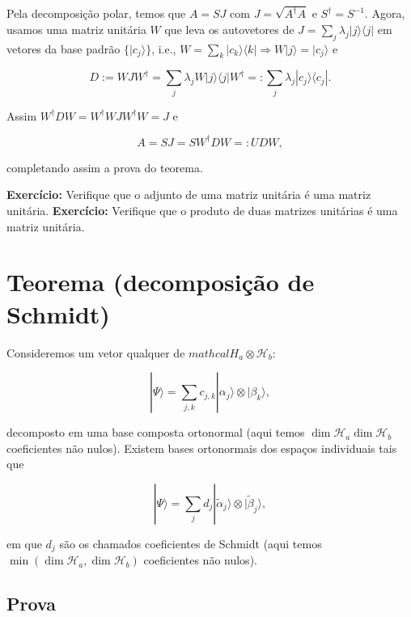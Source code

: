 \documentclass[11pt]{article}
\begin{document}
Pela decomposição polar, temos que \(A=SJ\) com
\(J=\sqrt{A^{\dagger}A}\) e \(S^{\dagger}=S^{-1}\). Agora, usamos uma
matriz unitária \(W\) que leva os autovetores de
\(J=\sum_{j}\lambda_{j}|j\rangle\langle j|\) em vetores da base padrão
\(\{|c_{j}\rangle\}\), i.e.,
\(W=\sum_{k}|c_{k}\rangle\langle k|\Rightarrow W|j\rangle=|c_{j}\rangle\)
e

\begin{equation}
D:=WJW^{\dagger}=\sum_{j}\lambda_{j}W|j\rangle\langle j|W^{\dagger}=:\sum_{j}\lambda_{j}|c_{j}\rangle\langle c_{j}|.
\end{equation}

Assim \(W^{\dagger}DW=W^{\dagger}WJW^{\dagger}W=J\) e

\begin{equation}
A=SJ=SW^{\dagger}DW=:UDW,
\end{equation}

completando assim a prova do teorema.

\textbf{Exercício:} Verifique que o adjunto de uma matriz unitária é uma
matriz unitária. \textbf{Exercício:} Verifique que o produto de duas
matrizes unitárias é uma matriz unitária.

    \section{Teorema (decomposição de
Schmidt)}\label{teorema-decomposiuxe7uxe3o-de-schmidt}

Consideremos um vetor qualquer de
\(mathcal{H}_{a}\otimes\mathcal{H}_{b}\):

\begin{equation}
|\Psi\rangle = \sum_{j,k}c_{j,k}|\alpha_{j}\rangle\otimes|\beta_{k}\rangle,
\end{equation}

decomposto em uma base composta ortonormal (aqui temos
\(\dim\mathcal{H}_{a}\dim\mathcal{H}_{b}\) coeficientes não nulos).
Existem bases ortonormais dos espaços individuais tais que

\begin{equation}
|\Psi\rangle = \sum_{j}d_{j}|\tilde{\alpha}_{j}\rangle\otimes|\tilde{\beta}_{j}\rangle,
\end{equation}

em que \(d_{j}\) são os chamados coeficientes de Schmidt (aqui temos
\(\min(\dim\mathcal{H}_{a},\dim\mathcal{H}_{b})\) coeficientes não
nulos).

\subsection{Prova}\label{prova}
\end{document}
